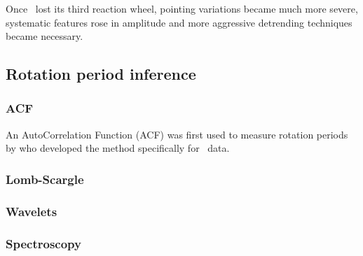 Once \kepler\ lost its third reaction wheel, pointing variations became much
more severe, systematic features rose in amplitude and more aggressive
detrending techniques became necessary.

\subsection{Rotation period inference}

\subsubsection{ACF}
An AutoCorrelation Function (ACF) was first used to measure rotation periods
by \citet{Mcquillan2013} who developed the method specifically for \kepler\
data.

\subsubsection{Lomb-Scargle}
\subsubsection{Wavelets}
\subsubsection{Spectroscopy}

